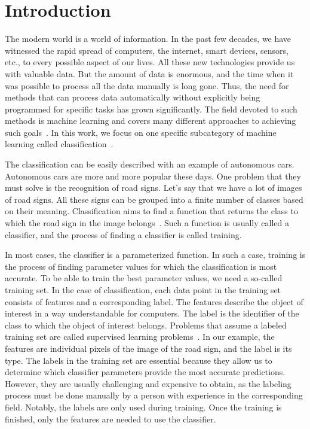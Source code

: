 \chapter*{Introduction}

The modern world is a world of information. In the past few decades, we have witnessed the rapid spread of computers, the internet, smart devices, sensors, etc., to every possible aspect of our lives. All these new technologies provide us with valuable data. But the amount of data is enormous, and the time when it was possible to process all the data manually is long gone. Thus, the need for methods that can process data automatically without explicitly being programmed for specific tasks has grown significantly. The field devoted to such methods is machine learning and covers many different approaches to achieving such goals~\cite{mitchell1997machine}. In this work, we focus on one specific subcategory of machine learning called classification~\cite{aggarwal2021artificial}.

The classification can be easily described with an example of autonomous cars. Autonomous cars are more and more popular these days. One problem that they must solve is the recognition of road signs. Let's say that we have a lot of images of road signs. All these signs can be grouped into a finite number of classes based on their meaning. Classification aims to find a function that returns the class to which the road sign in the image belongs~\cite{swaminathan2019autonomous}. Such a function is usually called a classifier, and the process of finding a classifier is called training.

In most cases, the classifier is a parameterized function. In such a case, training is the process of finding parameter values for which the classification is most accurate. To be able to train the best parameter values, we need a so-called training set. In the case of classification, each data point in the training set consists of features and a corresponding label. The features describe the object of interest in a way understandable for computers. The label is the identifier of the class to which the object of interest belongs. Problems that assume a labeled training set are called supervised learning problems~\cite{aggarwal2021artificial}. In our example, the features are individual pixels of the image of the road sign, and the label is its type. The labels in the training set are essential because they allow us to determine which classifier parameters provide the most accurate predictions. However, they are usually challenging and expensive to obtain, as the labeling process must be done manually by a person with experience in the corresponding field. Notably, the labels are only used during training. Once the training is finished, only the features are needed to use the classifier.

